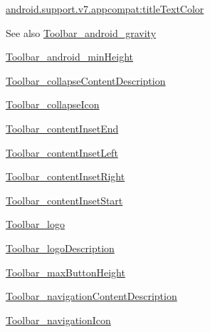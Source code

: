 {\ttfamily \hyperlink{classandroid_1_1support_1_1v7_1_1appcompat_1_1R_1_1styleable_a5597aef1e76e3ced24dcc4d749c2af73}{android.\+support.\+v7.\+appcompat\+:title\+Text\+Color}}

\begin{DoxySeeAlso}{See also}
\hyperlink{classandroid_1_1support_1_1v7_1_1appcompat_1_1R_1_1styleable_a0b7088280f7c520251692daae225c6af}{Toolbar\+\_\+android\+\_\+gravity} 

\hyperlink{classandroid_1_1support_1_1v7_1_1appcompat_1_1R_1_1styleable_a278fbe4009580f8f98dba7fedb82ccbb}{Toolbar\+\_\+android\+\_\+min\+Height} 

\hyperlink{classandroid_1_1support_1_1v7_1_1appcompat_1_1R_1_1styleable_aec52a9c7ecfc4636844699ac144daa45}{Toolbar\+\_\+collapse\+Content\+Description} 

\hyperlink{classandroid_1_1support_1_1v7_1_1appcompat_1_1R_1_1styleable_a3e43f0fbbc70178e90fc837859e72471}{Toolbar\+\_\+collapse\+Icon} 

\hyperlink{classandroid_1_1support_1_1v7_1_1appcompat_1_1R_1_1styleable_a77f3e7561dfc11958910a87c4ffaf5be}{Toolbar\+\_\+content\+Inset\+End} 

\hyperlink{classandroid_1_1support_1_1v7_1_1appcompat_1_1R_1_1styleable_a70db7f911845893b9659eba7d5388946}{Toolbar\+\_\+content\+Inset\+Left} 

\hyperlink{classandroid_1_1support_1_1v7_1_1appcompat_1_1R_1_1styleable_a8195e4a7fe77915a6f6fda3aec2831c8}{Toolbar\+\_\+content\+Inset\+Right} 

\hyperlink{classandroid_1_1support_1_1v7_1_1appcompat_1_1R_1_1styleable_a57f32786084bf693a66215a7c9de31ca}{Toolbar\+\_\+content\+Inset\+Start} 

\hyperlink{classandroid_1_1support_1_1v7_1_1appcompat_1_1R_1_1styleable_ad17c84854643ce15da5744493c1e7f28}{Toolbar\+\_\+logo} 

\hyperlink{classandroid_1_1support_1_1v7_1_1appcompat_1_1R_1_1styleable_a0b18e2d1f2ae0e17ea6c1c72fbee6ad1}{Toolbar\+\_\+logo\+Description} 

\hyperlink{classandroid_1_1support_1_1v7_1_1appcompat_1_1R_1_1styleable_ae47cf713bfead553edda363c784fd33b}{Toolbar\+\_\+max\+Button\+Height} 

\hyperlink{classandroid_1_1support_1_1v7_1_1appcompat_1_1R_1_1styleable_a61b517f99cb13ca2690103136bdab8b5}{Toolbar\+\_\+navigation\+Content\+Description} 

\hyperlink{classandroid_1_1support_1_1v7_1_1appcompat_1_1R_1_1styleable_ab88a1ca69cc3dbb4e5ffdadec5f6288a}{Toolbar\+\_\+navigation\+Icon} 


\end{DoxySeeAlso}
